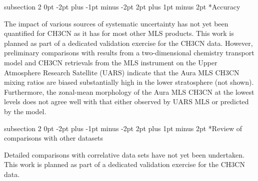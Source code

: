 \documentclass[11pt,draft]{report}
\makeatletter
\renewcommand{\subsection}{\@startsection%
  {subsection}%
  {2}%
  {0pt}%
  {-2pt plus -1pt minus -2pt}%
  {2pt plus 1pt minus 2pt}%
  {\large\sffamily\fontseries{sb}\selectfont\flushleft\color{SectionColor}\figureversion{tabular}}}%
\makeatother
\begin{document}
\subsection*{Accuracy}

The impact of various sources of systematic uncertainty has not yet
been quantified for CH\cs3CN as it has for most other MLS products.
This work is planned as part of a dedicated validation exercise for
the \thisv CH\cs3CN data.  However, preliminary comparisons with
results from a two-dimensional chemistry transport model and CH\cs3CN
retrievals from the MLS instrument on the Upper Atmosphere Research
Satellite (UARS) \citep{LiveseyEtal01} indicate that the \thisv Aura
MLS CH\cs3CN mixing ratios are biased substantially high in the lower
stratosphere (not shown).  Furthermore, the zonal-mean morphology of
the Aura MLS CH\cs3CN at the lowest levels does not agree well with
that either observed by UARS MLS or predicted by the model.

\subsection*{Review of comparisons with other datasets}

Detailed comparisons with correlative data sets have not yet been
undertaken.  This work is planned as part of a dedicated validation
exercise for the \thisv CH\cs3CN data.
\end{document}

